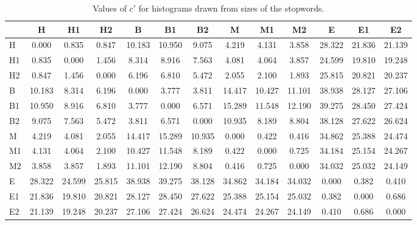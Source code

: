 \begin{table*}[h!]
\begin{center}
\begin{tabular}{| l | c | c | c | c | c | c | c | c | c | c | c | c |}\hline
 & H & H1 & H2 & B & B1 & B2 & M & M1 & M2 & E & E1 & E2 \\\hline
H & 0.000  & 0.835  & 0.847  & 10.183  & 10.950  & 9.075  & 4.219  & 4.131  & 3.858  & 28.322  & 21.836  & 21.139 \\\hline
H1 & 0.835  & 0.000  & 1.456  & 8.314  & 8.916  & 7.563  & 4.081  & 4.064  & 3.857  & 24.599  & 19.810  & 19.248 \\\hline
H2 & 0.847  & 1.456  & 0.000  & 6.196  & 6.810  & 5.472  & 2.055  & 2.100  & 1.893  & 25.815  & 20.821  & 20.237 \\\hline
B & 10.183  & 8.314  & 6.196  & 0.000  & 3.777  & 3.811  & 14.417  & 10.427  & 11.101  & 38.938  & 28.127  & 27.106 \\\hline
B1 & 10.950  & 8.916  & 6.810  & 3.777  & 0.000  & 6.571  & 15.289  & 11.548  & 12.190  & 39.275  & 28.450  & 27.424 \\\hline
B2 & 9.075  & 7.563  & 5.472  & 3.811  & 6.571  & 0.000  & 10.935  & 8.189  & 8.804  & 38.128  & 27.622  & 26.624 \\\hline
M & 4.219  & 4.081  & 2.055  & 14.417  & 15.289  & 10.935  & 0.000  & 0.422  & 0.416  & 34.862  & 25.388  & 24.474 \\\hline
M1 & 4.131  & 4.064  & 2.100  & 10.427  & 11.548  & 8.189  & 0.422  & 0.000  & 0.725  & 34.184  & 25.154  & 24.267 \\\hline
M2 & 3.858  & 3.857  & 1.893  & 11.101  & 12.190  & 8.804  & 0.416  & 0.725  & 0.000  & 34.032  & 25.032  & 24.149 \\\hline
E & 28.322  & 24.599  & 25.815  & 38.938  & 39.275  & 38.128  & 34.862  & 34.184  & 34.032  & 0.000  & 0.382  & 0.410 \\\hline
E1 & 21.836  & 19.810  & 20.821  & 28.127  & 28.450  & 27.622  & 25.388  & 25.154  & 25.032  & 0.382  & 0.000  & 0.686 \\\hline
E2 & 21.139  & 19.248  & 20.237  & 27.106  & 27.424  & 26.624  & 24.474  & 24.267  & 24.149  & 0.410  & 0.686  & 0.000 \\\hline
\end{tabular}
\caption{Values of $c'$ for histograms drawn from sizes of the stopwords.}
\end{center}
\end{table*}